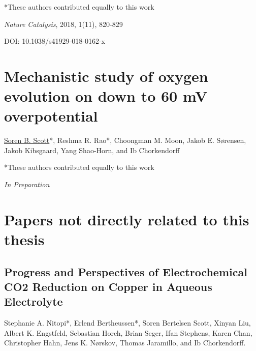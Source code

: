 		*These authors contributed equally to this work
		
		\textit{Nature Catalysis}, 2018, 1(11), 820-829 
		
		DOI: 10.1038/s41929-018-0162-x
		
			
		
		\clearpage
		\section[In Preparation: Mechanistic study of oxygen evolution on \ch{RuO2} down to 60 mV overpotential]{Mechanistic study of oxygen evolution on  down to 60 mV overpotential}\label{Scott2019_RuO2}
		
		\underline{Soren B. Scott}*, Reshma R. Rao*, Choongman M. Moon, Jakob E. S\o rensen, Jakob Kibsgaard, Yang Shao-Horn, and Ib Chorkendorff
		
		*These authors contributed equally to this work
		
		\textit{In Preparation}
		
		\clearpage
		\renewcommand{\thesection}{}
		\titleformat{\section}{\normalfont\LARGE\bfseries}{\thesection}{1em}{}	
		
		\section{Papers not directly related to this thesis}
		\renewcommand{\thesubsection}{\Roman{subsection}}
		\setcounter{subsection}{4}
		\vspace{2cm}

		\subsection{Progress and Perspectives of Electrochemical CO2 Reduction on Copper in Aqueous Electrolyte}\label{Nitopi2019}
		
		Stephanie A. Nitopi*, Erlend Bertheussen*, Soren Bertelsen Scott, Xinyan Liu, Albert K. Engstfeld, Sebastian Horch, Brian Seger, Ifan Stephens, Karen Chan, Christopher Hahn, Jens K. Nørskov, Thomas Jaramillo, and Ib Chorkendorff.
		
